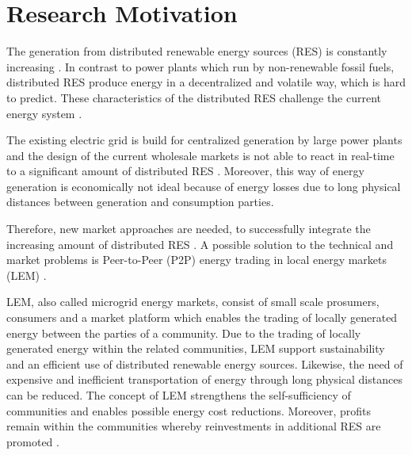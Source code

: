 \section{Research Motivation}
\label{sec:research_motivation}

The generation from distributed renewable energy sources (RES) is constantly increasing . In contrast to power plants which run by non-renewable fossil fuels, distributed RES produce energy in a decentralized and volatile way, which is hard to predict. These characteristics of the distributed RES challenge the current energy system .

The existing electric grid is build for centralized generation by large power plants and the design of the current wholesale markets is not able to react in real-time to a significant amount of distributed RES  . Moreover, this way of energy generation is economically not ideal because of energy losses due to long physical distances between generation and consumption parties. 

Therefore, new market approaches are needed, to successfully integrate the increasing amount of distributed RES . A possible solution to the technical and market problems is Peer-to-Peer (P2P) energy trading in local energy markets (LEM) . 

LEM, also called microgrid energy markets, consist of small scale prosumers, consumers and a market platform which enables the trading of locally generated energy between the parties of a community. Due to the trading of locally generated energy within the related communities, LEM support sustainability and an efficient use of distributed renewable energy sources. Likewise, the need of expensive and inefficient transportation of energy through long physical distances can be reduced. The concept of LEM strengthens the self-sufficiency of communities and enables possible energy cost reductions. Moreover, profits remain within the communities whereby reinvestments in additional RES are promoted . 

